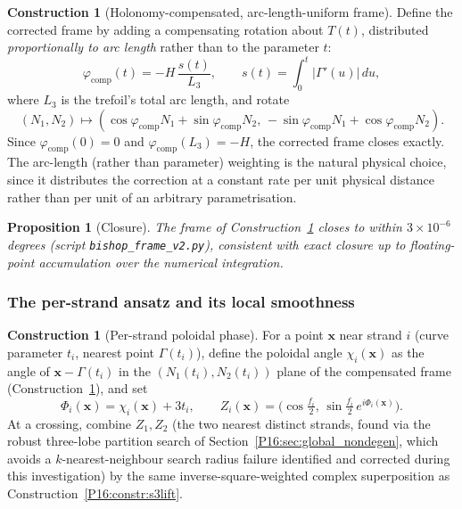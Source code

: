 \documentclass[11pt,a4paper]{article}
\newtheorem{proposition}[theorem]{Proposition}
\theoremstyle{definition}\newtheorem{definition}[theorem]{Definition}
\theoremstyle{remark}
\theoremstyle{definition}\newtheorem{construction}[theorem]{Construction}
\begin{document}
\begin{construction}[Holonomy-compensated, arc-length-uniform frame]
\label{P16:constr:compensated_frame}
Define the corrected frame by adding a compensating rotation about
$T(t)$, distributed \emph{proportionally to arc length} rather than
to the parameter $t$:
\begin{equation}
  \varphi_{\mathrm{comp}}(t) = -H\,\frac{s(t)}{L_3},
  \qquad
  s(t)=\int_0^t|\Gamma'(u)|\,du,
  \label{P16:eq:arclength_comp}
\end{equation}
where $L_3$ is the trefoil's total arc length, and rotate
\begin{equation}
(N_1,N_2)\mapsto(\cos\varphi_{\mathrm{comp}}N_1+\sin\varphi_{\mathrm{comp}}N_2,\,
-\sin\varphi_{\mathrm{comp}}N_1+\cos\varphi_{\mathrm{comp}}N_2). 
\end{equation}
Since
$\varphi_{\mathrm{comp}}(0)=0$ and $\varphi_{\mathrm{comp}}(L_3)=-H$,
the corrected frame closes exactly. The arc-length (rather than
parameter) weighting is the natural physical choice, since it
distributes the correction at a constant rate per unit physical
distance rather than per unit of an arbitrary parametrisation.
\end{construction}

\begin{proposition}[Closure]
\label{P16:prop:frame_closure}
The frame of Construction~\ref{P16:constr:compensated_frame} closes to
within $3\times10^{-6}$ degrees (script \texttt{bishop\_frame\_v2.py}),
consistent with exact closure up to floating-point accumulation over
the numerical integration.
\end{proposition}

\subsubsection{The per-strand ansatz and its local smoothness}

\begin{construction}[Per-strand poloidal phase]
\label{P16:constr:perstrand}
For a point $\mathbf{x}$ near strand $i$ (curve parameter $t_i$,
nearest point $\Gamma(t_i)$), define the poloidal angle
$\chi_i(\mathbf{x})$ as the angle of $\mathbf{x}-\Gamma(t_i)$ in the
$(N_1(t_i),N_2(t_i))$ plane of the compensated frame
(Construction~\ref{P16:constr:compensated_frame}), and set
\begin{equation}
  \Phi_i(\mathbf{x}) = \chi_i(\mathbf{x}) + 3t_i,
  \qquad
  Z_i(\mathbf{x}) = \bigl(\cos\tfrac{f_i}2,\,\sin\tfrac{f_i}2\,e^{i\Phi_i(\mathbf{x})}\bigr).
  \label{P16:eq:perstrand_doublet}
\end{equation}
At a crossing, combine $Z_1,Z_2$ (the two nearest distinct strands,
found via the robust three-lobe partition search of
Section~\ref{P16:sec:global_nondegen}, which avoids a $k$-nearest-neighbour
search radius failure identified and corrected during this
investigation) by the same inverse-square-weighted complex
superposition as Construction~\ref{P16:constr:s3lift}.
\end{construction}
\end{document}
